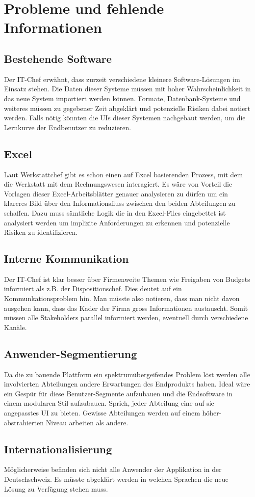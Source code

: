 \section{Probleme und fehlende Informationen}

  \subsection{Bestehende Software}
  Der IT-Chef erwähnt, dass zurzeit verschiedene kleinere Software-Lösungen im Einsatz stehen.
  Die Daten dieser Systeme müssen mit hoher Wahrscheinlichkeit in das neue System importiert werden können.
  Formate, Datenbank-Systeme und weiteres müssen zu gegebener Zeit abgeklärt und potenzielle Risiken dabei notiert werden.
  Falls nötig könnten die UIs dieser Systemen nachgebaut werden, um die Lernkurve der Endbenutzer zu reduzieren.

  \subsection{Excel}
  Laut Werkstattchef gibt es schon einen auf Excel basierenden Prozess, mit dem die Werkstatt mit dem Rechnungswesen interagiert.
  Es wäre von Vorteil die Vorlagen dieser Excel-Arbeitsblätter genauer analysieren zu dürfen um ein klareres Bild über den Informationsfluss zwischen den beiden Abteilungen zu schaffen.
  Dazu muss sämtliche Logik die in den Excel-Files eingebettet ist analysiert werden um implizite Anforderungen zu erkennen und potenzielle Risiken zu identifizieren.
  
  \subsection{Interne Kommunikation}
  Der IT-Chef ist klar besser über Firmenweite Themen wie Freigaben von Budgets informiert als z.B. der Dispositionschef. Dies deutet auf ein Kommunkationsproblem hin.
  Man müsste also notieren, dass man nicht davon ausgehen kann, dass das Kader der Firma gross Informationen austauscht. Somit müssen alle Stakeholders parallel informiert werden, eventuell durch verschiedene Kanäle.

  \subsection{Anwender-Segmentierung}
  Da die zu bauende Plattform ein spektrumübergeifendes Problem löst werden alle involvierten Abteilungen andere Erwartungen des Endprodukts haben.
  Ideal wäre ein Gespür für diese Benutzer-Segmente aufzubauen und die Endsoftware in einem modularen Stil aufzubauen. Sprich, jeder Abteilung eine auf sie angepasstes UI zu bieten.
  Gewisse Abteilungen werden auf einem höher-abstrahierten Niveau arbeiten als andere.
  
  \subsection{Internationalisierung}
  Möglicherweise befinden sich nicht alle Anwender der Applikation in der Deutschschweiz. Es müsste abgeklärt werden in welchen Sprachen die neue Lösung zu Verfügung stehen muss.

